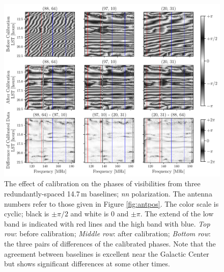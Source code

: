 \documentclass[twocolumn, trackchanges]{aastex61}
\begin{document}
{\begin{figure}
\centering
\includegraphics[scale=0.38]{calibration_on_phases_noflags.pdf}
\caption{
The effect of calibration on the phases of visibilities from three redundantly-spaced 14.7\,m baselines; \textit{nn} polarization. 
The antenna numbers refer to those given in Figure \ref{fig:antpos}.
The color scale is cyclic; black is $\pm\pi/2$ and white is 0 and $\pm\pi$. The extend of the low band is indicated with red lines and the high band with blue.  
\textit{Top row}: before calibration; \textit{Middle row}: after calibration; \textit{Bottom row}: the three pairs of differences of the calibrated phases.  
Note that the agreement between baselines is excellent near the Galactic Center but shows significant differences at some other times.
}
\label{fig:phasecal}
\end{figure}

}
\end{document}
